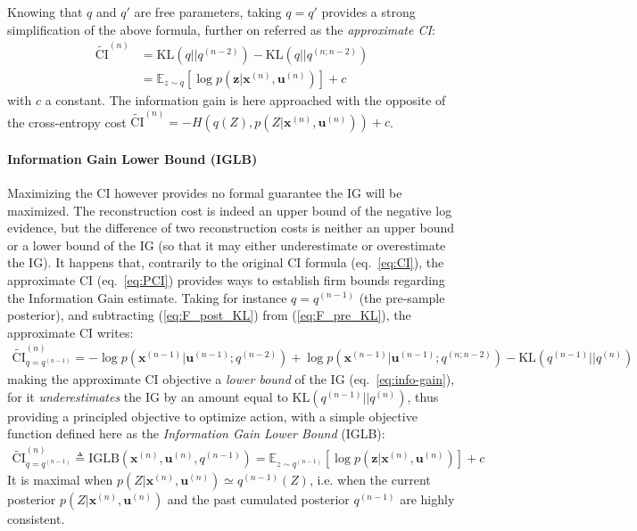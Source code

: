 \documentclass[12pt,twoside,openright]{article}
\begin{document}
Knowing that $q$ and $q'$ are free parameters, taking $q=q'$ provides a strong simplification of the above formula, further on referred as the \emph{approximate CI}:
\begin{align}
	\tilde{\text{CI}}^{(n)} 
	&= \text{KL} (q||q^{(n-2)}) -  \text{KL}(q|| q^{(n;n-2)})\\
	&= \mathbb{E}_{z\sim q} \left[\log p(\boldsymbol{z}|\boldsymbol{x}^{(n)}, \boldsymbol{u}^{(n)})\right] + c\label{eq:PCI}
\end{align}
with $c$ a constant. 
The information gain is here approached with the opposite of the cross-entropy cost $\tilde{\text{CI}}^{(n)} = -H(q(Z),p(Z|\boldsymbol{x}^{(n)}, \boldsymbol{u}^{(n)})) + c$.

\paragraph{Information Gain Lower Bound (IGLB)}
Maximizing the CI however provides no formal guarantee the IG will be maximized. The reconstruction cost is indeed an upper bound of the negative log evidence, but the difference of two reconstruction costs is neither an upper bound or a lower bound of the IG (so  that it may either underestimate or overestimate the IG). It happens that, contrarily to the original CI formula (eq.~\ref{eq:CI}), the approximate CI (eq.~\ref{eq:PCI}) provides ways to establish firm bounds regarding the Information Gain estimate.
Taking for instance $q= q^{(n-1)}$ (the pre-sample posterior), and subtracting (\ref{eq:F_post_KL}) from (\ref{eq:F_pre_KL}), the approximate CI writes:
\begin{align}
	\tilde{\text{CI}}^{(n)}_{q = q^{(n-1)}} = 
	-\log p(\boldsymbol{x}^{(n-1)}|\boldsymbol{u}^{(n-1)}; q^{(n-2)}) 
	+ \log p(\boldsymbol{x}^{(n-1)}|\boldsymbol{u}^{(n-1)}; q^{(n;n-2)}) - \text{KL} (q^{(n-1)}||q^{(n)})
\end{align}
making the approximate CI objective a \emph{lower bound} of the IG (eq.~\ref{eq:info-gain}), for it \emph{underestimates} the IG by an amount equal to $\text{KL} (q^{(n-1)}||q^{(n)})$, thus providing a principled objective to optimize action, with  a simple objective function defined here as the \emph{Information Gain Lower Bound} (IGLB):
\begin{align}
	\tilde{\text{CI}}^{(n)}_{q = q^{(n-1)}} 
	\triangleq \text{IGLB}(\boldsymbol{x}^{(n)}, \boldsymbol{u}^{(n)}, q^{(n-1)})
	= \mathbb{E}_{z\sim q^{(n-1)}} \left[\log p(\boldsymbol{z}|\boldsymbol{x}^{(n)}, \boldsymbol{u}^{(n)})\right] + c\label{eq:PCI-n-1}
\end{align}
It is maximal when $p(Z|\boldsymbol{x}^{(n)}, \boldsymbol{u}^{(n)})\simeq q^{(n-1)}(Z)$, i.e. when the current posterior $p(Z|\boldsymbol{x}^{(n)}, \boldsymbol{u}^{(n)})$ and the past cumulated posterior $q^{(n-1)}$ are highly consistent.
\end{document}
